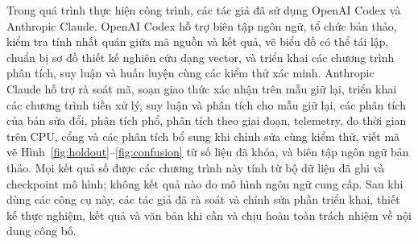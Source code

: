 \documentclass[11pt,a4paper]{article}
\begin{document}
Trong quá trình thực hiện công trình, các tác giả đã sử dụng OpenAI Codex và Anthropic Claude. OpenAI Codex
hỗ trợ biên tập ngôn ngữ, tổ chức bản thảo, kiểm tra tính nhất quán giữa mã nguồn và kết quả, vẽ biểu đồ có
thể tái lập, chuẩn bị sơ đồ thiết kế nghiên cứu dạng vector, và triển khai các chương trình phân tích, suy luận
và huấn luyện cùng các kiểm thử xác minh. Anthropic Claude hỗ trợ rà soát mã, soạn giao thức xác nhận trên mẫu
giữ lại, triển khai các chương trình tiền xử lý, suy luận và phân tích cho mẫu giữ lại, các phân tích của bản
sửa đổi, phân tích phổ, phân tích theo giai đoạn, telemetry, đo thời gian trên CPU, cổng và các phân tích bổ sung khi chỉnh sửa cùng kiểm thử, viết mã vẽ
Hình~\ref{fig:holdout}--\ref{fig:confusion} từ số liệu đã khóa, và biên tập ngôn ngữ bản thảo. Mọi kết quả số được các chương trình này tính từ bộ dữ
liệu đã ghi và checkpoint mô hình; không kết quả nào do mô hình ngôn ngữ cung cấp. Sau khi dùng các công cụ
này, các tác giả đã rà soát và chỉnh sửa phần triển khai, thiết kế thực nghiệm, kết quả và văn bản khi cần và
chịu hoàn toàn trách nhiệm về nội dung công bố.

\begingroup
\small

\endgroup
\end{document}
